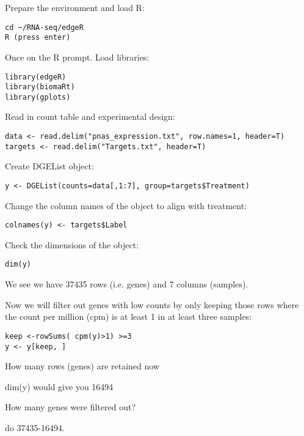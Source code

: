 \begin{steps}
Prepare the environment and load R:
\begin{lstlisting}
cd ~/RNA-seq/edgeR
R (press enter)
\end{lstlisting}

Once on the R prompt. Load libraries:
\begin{lstlisting}
library(edgeR)
library(biomaRt)
library(gplots)
\end{lstlisting}

Read in count table and experimental design:
\begin{lstlisting}
data <- read.delim("pnas_expression.txt", row.names=1, header=T)
targets <- read.delim("Targets.txt", header=T)
\end{lstlisting}

Create DGEList object:
\begin{lstlisting}
y <- DGEList(counts=data[,1:7], group=targets$Treatment)
\end{lstlisting}

Change the column names of the object to align with treatment:
\begin{lstlisting}
colnames(y) <- targets$Label
\end{lstlisting}

Check the dimensions of the object:
\begin{lstlisting}
dim(y)
\end{lstlisting}

We see we have 37435 rows (i.e. genes) and 7 columns (samples).

Now we will filter out genes with low counts by only keeping those rows where the count
per million (cpm) is at least 1 in at least three samples:
\begin{lstlisting}
keep <-rowSums( cpm(y)>1) >=3
y <- y[keep, ]
\end{lstlisting}

\end{steps}

\begin{questions}
How many rows (genes) are retained now
\begin{answer}
dim(y) would give you 16494
\end{answer}

How many genes were filtered out?
\begin{answer}
do 37435-16494.
\end{answer}
\end{questions}


